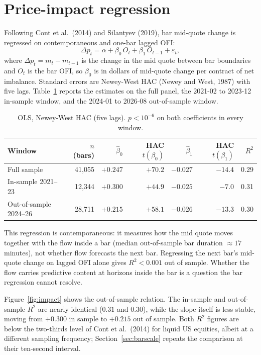 \documentclass[11pt,a4paper]{article}
\begin{document}
\section{Price-impact regression}
\label{sec:impact}

Following Cont et al.\ (2014) and Silantyev (2019), bar mid-quote change is regressed on contemporaneous and one-bar lagged OFI:
\begin{equation}
\Delta p_t = \alpha + \beta_0 \, O_t + \beta_1 \, O_{t-1} + \varepsilon_t,
\end{equation}
where $\Delta p_t = m_t - m_{t-1}$ is the change in the mid quote between bar boundaries and $O_t$ is the bar OFI, so $\beta_0$ is in dollars of mid-quote change per contract of net imbalance. Standard errors are Newey-West HAC (Newey and West, 1987) with five lags. Table~\ref{tab:impact} reports the estimates on the full panel, the 2021-02 to 2023-12 in-sample window, and the 2024-01 to 2026-08 out-of-sample window.

\begin{table}[H]
\centering
\small
\begin{tabular}{lrrrrrr}
\toprule
Window & $n$ (bars) & $\hat\beta_0$ & HAC $t(\beta_0)$ & $\hat\beta_1$ & HAC $t(\beta_1)$ & $R^2$ \\
\midrule
Full sample            & 41{,}055 & $+0.247$ & $+70.2$ & $-0.027$ & $-14.4$ & 0.29 \\
In-sample 2021--23     & 12{,}344 & $+0.300$ & $+44.9$ & $-0.025$ & $-7.0$  & 0.31 \\
Out-of-sample 2024--26 & 28{,}711 & $+0.215$ & $+58.1$ & $-0.026$ & $-13.3$ & 0.30 \\
\bottomrule
\end{tabular}
\caption{OLS, Newey-West HAC (five lags). $p < 10^{-6}$ on both coefficients in every window.}
\label{tab:impact}
\end{table}

This regression is contemporaneous: it measures how the mid quote moves together with the flow inside a bar (median out-of-sample bar duration ${\approx} 17$ minutes), not whether flow forecasts the next bar. Regressing the next bar's mid-quote change on lagged OFI alone gives $R^2 < 0.001$ out of sample. Whether the flow carries predictive content at horizons inside the bar is a question the bar regression cannot resolve.

Figure~\ref{fig:impact} shows the out-of-sample relation. The in-sample and out-of-sample $R^2$ are nearly identical ($0.31$ and $0.30$), while the slope itself is less stable, moving from $+0.300$ in sample to $+0.215$ out of sample. Both $R^2$ figures are below the two-thirds level of Cont et al.\ (2014) for liquid US equities, albeit at a different sampling frequency; Section~\ref{sec:barscale} repeats the comparison at their ten-second interval.
\end{document}
